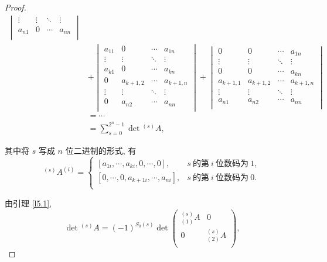 \documentclass[color=black,device=normal,lang=cn,mode=geye]{elegantnote}
\begin{document}
\begin{proof}
\begin{align*}
\begin{vmatrix}
            \vdots & \vdots & \ddots & \vdots \\
            a_{n1} & 0 & \cdots & a_{nn} \\
        \end{vmatrix} \\
        & +\begin{vmatrix}
            a_{11} & 0 & \cdots & a_{1n} \\
            \vdots & \vdots & \ddots & \vdots \\
            a_{k1} & 0 & \cdots & a_{kn} \\
            0 & a_{k+1,2} & \cdots & a_{k+1,n} \\
            \vdots & \vdots & \ddots & \vdots \\
            0 & a_{n2} & \cdots & a_{nn} \\
        \end{vmatrix}+\begin{vmatrix}
            0 & 0 & \cdots & a_{1n} \\
            \vdots & \vdots & \ddots & \vdots \\
            0 & 0 & \cdots & a_{kn} \\
            a_{k+1,1} & a_{k+1,2} & \cdots & a_{k+1,n} \\
            \vdots & \vdots & \ddots & \vdots \\
            a_{n1} & a_{n2} & \cdots & a_{nn} \\
        \end{vmatrix} \\
        & =\cdots \\
        & =\sum\limits_{s=0}^{2^n-1}\det{}^{(s)}A,
    \end{align*}

    其中将 $s$ 写成 $n$ 位二进制的形式, 有
    \[^{(s)}A^{(i)}=\begin{cases}
        [a_{1i},\cdots,a_{ki},0,\cdots,0], & s\ \text{的第}\ i\ \text{位数码为}\ 1, \\
        [0,\cdots,0,a_{k+1i},\cdots,a_{ni}], & s\ \text{的第}\ i\ \text{位数码为}\ 0 .\\
    \end{cases}\]

    由引理 \ref{l5.1},
    \[\det{}^{(s)}A=(-1)^{S_0(s)}\det\begin{pmatrix}
        {}_{(1)}^{(s)}A & 0 \\
        0 & {}_{(2)}^{(s)}A \\
    \end{pmatrix},\]


\end{proof}
\end{document}
